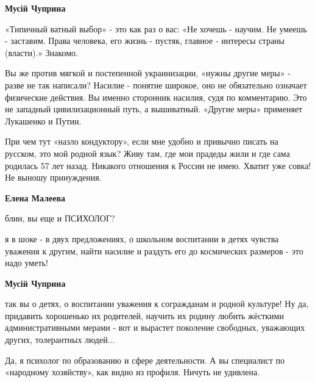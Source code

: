 \begin{itemize}
\begin{itemize}
 
\textbf{Мусій Чуприна} 

«Типичный ватный выбор» - это как раз о вас: «Не хочешь - научим. Не умеешь -
заставим. Права человека, его жизнь - пустяк, главное - интересы страны
(власти).» Знакомо.

Вы же против мягкой и постепенной украинизации, «нужны другие меры» - разве не
так написали? Насилие - понятие широкое, оно не обязательно означает физические
действия. Вы именно сторонник насилия, судя по комментарию. Это не западный
цивилизационный путь, а вышиватный. «Другие меры» применяет Лукашенко и Путин.

При чем тут «назло кондуктору», если мне удобно и привычно писать на русском,
это мой родной язык? Живу там, где мои прадеды жили и где сама родилась 57 лет
назад. Никакого отношения к России не имею. Хватит уже совка! Не выношу
принуждения.

 
\textbf{Елена Малеева} 

блин, вы еще и ПСИХОЛОГ?

я в шоке - в двух предложениях, о школьном воспитании в детях чувства уважения
к другим, найти насилие и раздуть его до космических размеров - это надо уметь!

 
\textbf{Мусій Чуприна} 

так вы о детях, о воспитании уважения к согражданам и родной культуре! Ну да,
придавить хорошенько их родителей, научить их родину любить жёсткими
административными мерами - вот и вырастет поколение свободных, уважающих
других, толерантных людей...

Да, я психолог по образованию и сфере деятельности. А вы специалист по
«народному хозяйству», как видно из профиля. Ничуть не удивлена.

 

\end{itemize}
\end{itemize}
